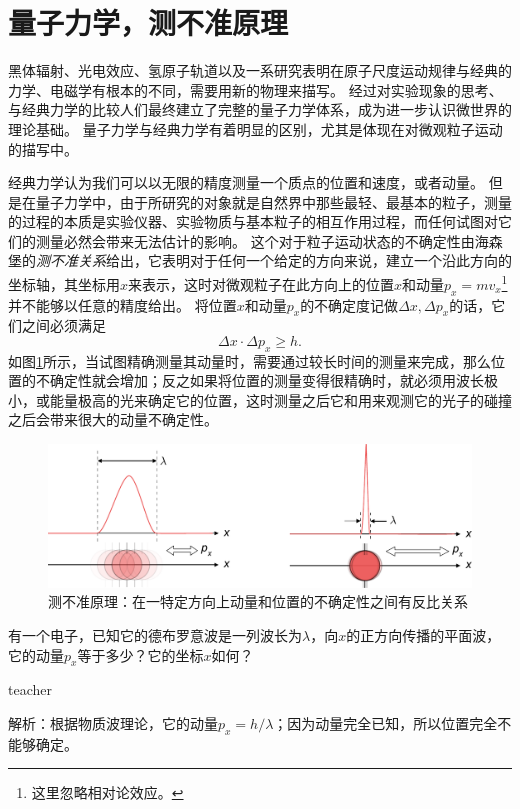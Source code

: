 \section{量子力学，测不准原理}
黑体辐射、光电效应、氢原子轨道以及一系研究表明在原子尺度运动规律与经典的力学、电磁学有根本的不同，需要用新的物理来描写。
经过对实验现象的思考、与经典力学的比较人们最终建立了完整的量子力学体系，成为进一步认识微世界的理论基础。
量子力学与经典力学有着明显的区别，尤其是体现在对微观粒子运动的描写中。

经典力学认为我们可以以无限的精度测量一个质点的位置和速度，或者动量。
但是在量子力学中，由于所研究的对象就是自然界中那些最轻、最基本的粒子，测量的过程的本质是实验仪器、实验物质与基本粒子的相互作用过程，而任何试图对它们的测量必然会带来无法估计的影响。
这个对于粒子运动状态的不确定性由海森堡的\emph{测不准关系}给出，它表明对于任何一个给定的方向来说，建立一个沿此方向的坐标轴，其坐标用$x$来表示，这时对微观粒子在此方向上的位置$x$和动量$p_x = mv_x$\footnote{这里忽略相对论效应。}并不能够以任意的精度给出。
将位置$x$和动量$p_x$的不确定度记做$\Delta x,\Delta p_x$的话，它们之间必须满足
\begin{equation}
\Delta x\cdot\Delta p_x \ge h.
\end{equation}
如图\ref{fig:particle-7}所示，当试图精确测量其动量时，需要通过较长时间的测量来完成，那么位置的不确定性就会增加；反之如果将位置的测量变得很精确时，就必须用波长极小，或能量极高的光来确定它的位置，这时测量之后它和用来观测它的光子的碰撞之后会带来很大的动量不确定性。



\begin{figure}[ht]
\centering
\includegraphics[width=0.6\linewidth]{images/particle-7}
\caption{测不准原理：在一特定方向上动量和位置的不确定性之间有反比关系}
\label{fig:particle-7}
\end{figure}




\begin{example}
有一个电子，已知它的德布罗意波是一列波长为$\lambda$，向$x$的正方向传播的平面波，它的动量$p_x$等于多少？它的坐标$x$如何？

\begin{taggedblock}{teacher}

解析：根据物质波理论，它的动量$p_x = h/\lambda$；因为动量完全已知，所以位置完全不能够确定。
\end{taggedblock}
\end{example}



